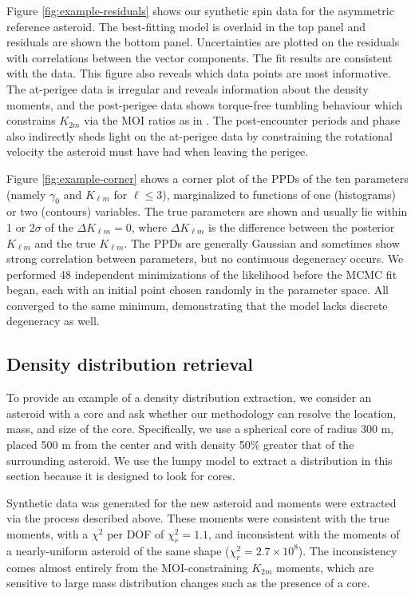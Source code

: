 \documentclass[fleqn,usenatbib]{mnras}
\begin{document}
Figure \ref{fig:example-residuals} shows our synthetic spin data for the asymmetric reference asteroid. The best-fitting model is overlaid in the top panel and residuals are shown the bottom panel. Uncertainties are plotted on the residuals with correlations between the vector components. The fit results are consistent with the data. This figure also reveals which data points are most informative. The at-perigee data is irregular and reveals information about the density moments, and the post-perigee data shows torque-free tumbling behaviour which constrains $K_{2m}$ via the MOI ratios as in \cite{MOSKOVITZ2020113519}. The post-encounter periods and phase also indirectly sheds light on the at-perigee data by constraining the rotational velocity the asteroid must have had when leaving the perigee.

Figure \ref{fig:example-corner} shows a corner plot of the PPDs of the ten parameters (namely $\gamma_0$ and $K_{\ell m}$ for $\ell \leq 3$), marginalized to functions of one (histograms) or two (contours) variables. The true parameters are shown and usually lie within 1 or 2$\sigma$ of the $\Delta K_{\ell m} = 0$, where $\Delta K_{\ell m}$ is the difference between the posterior $K_{\ell m}$ and the true $K_{\ell m}$. The PPDs are generally Gaussian and sometimes show strong correlation between parameters, but no continuous degeneracy occurs. We performed 48 independent minimizations of the likelihood before the MCMC fit began, each with an initial point chosen randomly in the parameter space. All converged to the same minimum, demonstrating that the model lacks discrete degeneracy as well.



\subsection{Density distribution retrieval}
\label{sec:results-distro}

To provide an example of a density distribution extraction, we consider an asteroid with a core and ask whether our methodology can resolve the location, mass, and size of the core. Specifically, we use a spherical core of radius 300 m, placed 500 m from the center and with density 50\% greater that of the surrounding asteroid. We use the lumpy model to extract a distribution in this section because it is designed to look for cores.

Synthetic data was generated for the new asteroid and moments were extracted via the process described above. These moments were consistent with the true moments, with a $\chi^2$ per DOF of $\chi^2_r = 1.1$, and inconsistent with the moments of a nearly-uniform asteroid of the same shape ($\chi^2_r = 2.7 \times 10^8$). The inconsistency comes almost entirely from the MOI-constraining $K_{2m}$ moments, which are sensitive to large mass distribution changes such as the presence of a core.
\end{document}
